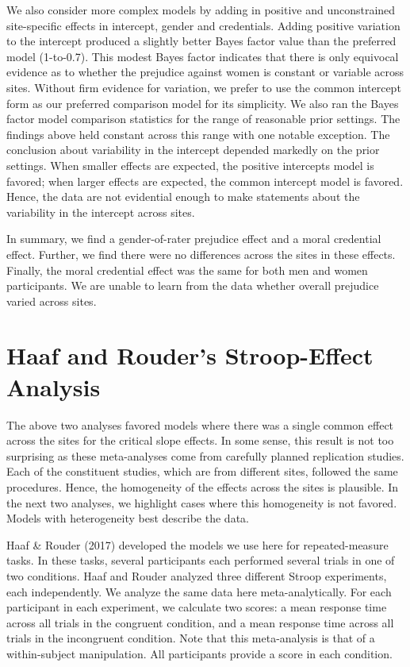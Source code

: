\documentclass[english,man]{apa6}
\theoremstyle{definition}
\theoremstyle{definition}
\theoremstyle{remark}
\begin{document}
We also consider more complex models by adding in positive and
unconstrained site-specific effects in intercept, gender and
credentials. Adding positive variation to the intercept produced a
slightly better Bayes factor value than the preferred model (1-to-0.7).
This modest Bayes factor indicates that there is only equivocal evidence
as to whether the prejudice against women is constant or variable across
sites. Without firm evidence for variation, we prefer to use the common
intercept form as our preferred comparison model for its simplicity. We
also ran the Bayes factor model comparison statistics for the range of
reasonable prior settings. The findings above held constant across this
range with one notable exception. The conclusion about variability in
the intercept depended markedly on the prior settings. When smaller
effects are expected, the positive intercepts model is favored; when
larger effects are expected, the common intercept model is favored.
Hence, the data are not evidential enough to make statements about the
variability in the intercept across sites.

In summary, we find a gender-of-rater prejudice effect and a moral
credential effect. Further, we find there were no differences across the
sites in these effects. Finally, the moral credential effect was the
same for both men and women participants. We are unable to learn from
the data whether overall prejudice varied across sites.

\section{Haaf and Rouder's Stroop-Effect
Analysis}\label{haaf-and-rouders-stroop-effect-analysis}

The above two analyses favored models where there was a single common
effect across the sites for the critical slope effects. In some sense,
this result is not too surprising as these meta-analyses come from
carefully planned replication studies. Each of the constituent studies,
which are from different sites, followed the same procedures. Hence, the
homogeneity of the effects across the sites is plausible. In the next
two analyses, we highlight cases where this homogeneity is not favored.
Models with heterogeneity best describe the data.

Haaf \& Rouder (2017) developed the models we use here for
repeated-measure tasks. In these tasks, several participants each
performed several trials in one of two conditions. Haaf and Rouder
analyzed three different Stroop experiments, each independently. We
analyze the same data here meta-analytically. For each participant in
each experiment, we calculate two scores: a mean response time across
all trials in the congruent condition, and a mean response time across
all trials in the incongruent condition. Note that this meta-analysis is
that of a within-subject manipulation. All participants provide a score
in each condition.
\end{document}
